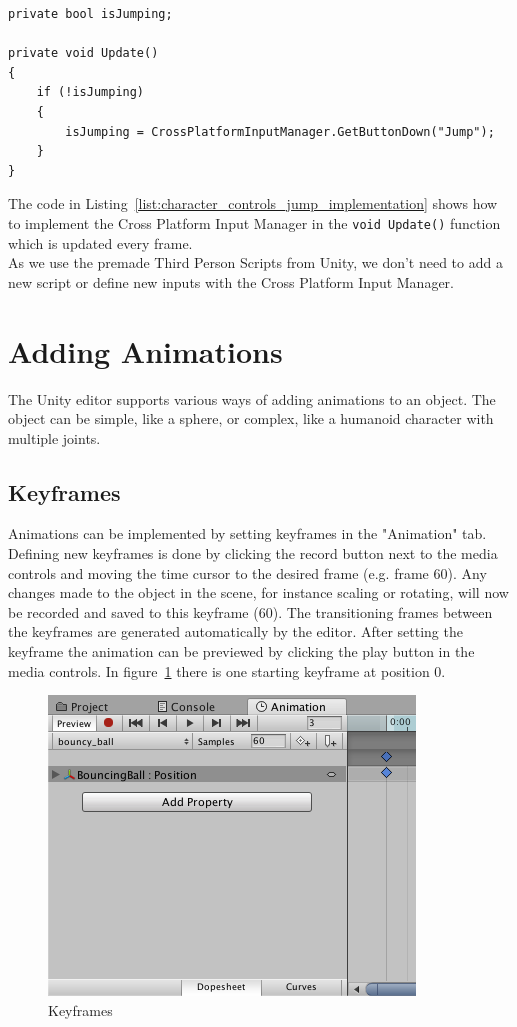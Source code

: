 \documentclass[12pt, a4paper, titlepage]{article}
\begin{document}
\begin{lstlisting}[caption=Example Implementation for Determining a Jump,label=list:character_controls_jump_implementation]
private bool isJumping;

private void Update()
{
	if (!isJumping)
	{
		isJumping = CrossPlatformInputManager.GetButtonDown("Jump");
	}
}
\end{lstlisting}

The code in Listing~\ref{list:character_controls_jump_implementation} shows how to implement the Cross Platform Input Manager in the \lstinline!void Update()! function which is updated every frame. \\

As we use the premade Third Person Scripts from Unity, we don't need to add a new script or define new inputs with the Cross Platform Input Manager.

\section{Adding Animations}

The Unity editor supports various ways of adding animations to an object. The object can be simple, like a sphere, or complex, like a humanoid character with multiple joints. 

\subsection{Keyframes}

Animations can be implemented by setting keyframes in the "Animation" tab. Defining new keyframes is done by clicking the record button next to the media controls and moving the time cursor to the desired frame (e.g. frame 60). Any changes made to the object in the scene, for instance scaling or rotating, will now be recorded and saved to this keyframe (60). The transitioning frames between the keyframes are generated automatically by the editor. After setting the keyframe the animation can be previewed by clicking the play button in the media controls. In figure~\ref{fig:adding_animations_keyframes} there is one starting keyframe at position 0.

\begin{figure}[htbp]
  \centering
  \includegraphics[width=.4\textwidth]{pictures/keyframes}
  \caption{Keyframes}
  \label{fig:adding_animations_keyframes}
\end{figure}
\end{document}
